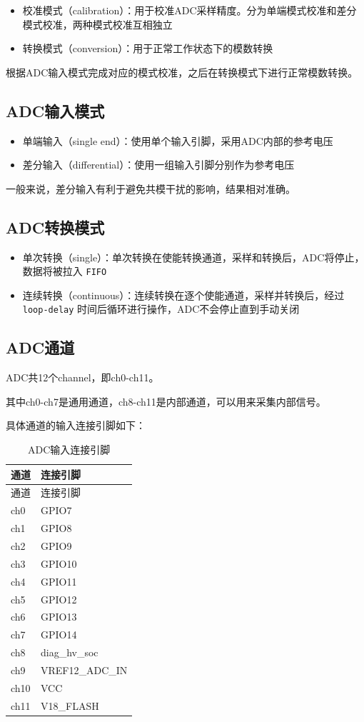 \documentclass[
  12pt,
]{book}
\begin{document}
\begin{itemize}
\item
  校准模式（calibration）：用于校准ADC采样精度。分为单端模式校准和差分模式校准，两种模式校准互相独立
\item
  转换模式（conversion）：用于正常工作状态下的模数转换
\end{itemize}

根据ADC输入模式完成对应的模式校准，之后在转换模式下进行正常模数转换。

\hypertarget{adcux8f93ux5165ux6a21ux5f0f}{%
\subsection{ADC输入模式}\label{adcux8f93ux5165ux6a21ux5f0f}}

\begin{itemize}
\item
  单端输入（single end）：使用单个输入引脚，采用ADC内部的参考电压
\item
  差分输入（differential）：使用一组输入引脚分别作为参考电压
\end{itemize}

一般来说，差分输入有利于避免共模干扰的影响，结果相对准确。

\hypertarget{adcux8f6cux6362ux6a21ux5f0f}{%
\subsection{ADC转换模式}\label{adcux8f6cux6362ux6a21ux5f0f}}

\begin{itemize}
\item
  单次转换（single）：单次转换在使能转换通道，采样和转换后，ADC将停止，数据将被拉入 \texttt{FIFO}
\item
  连续转换（continuous）：连续转换在逐个使能通道，采样并转换后，经过 \texttt{loop-delay} 时间后循环进行操作，ADC不会停止直到手动关闭
\end{itemize}

\hypertarget{adcux901aux9053}{%
\subsection{ADC通道}\label{adcux901aux9053}}

ADC共12个channel，即ch0-ch11。

其中ch0-ch7是通用通道，ch8-ch11是内部通道，可以用来采集内部信号。

具体通道的输入连接引脚如下：

\begin{longtable}[]{@{}ll@{}}
\caption{\label{tab:ch-ADC-input-connection} ADC输入连接引脚}\tabularnewline
\toprule
通道 & 连接引脚\tabularnewline
\midrule
\endfirsthead
\toprule
通道 & 连接引脚\tabularnewline
\midrule
\endhead
ch0 & GPIO7\tabularnewline
ch1 & GPIO8\tabularnewline
ch2 & GPIO9\tabularnewline
ch3 & GPIO10\tabularnewline
ch4 & GPIO11\tabularnewline
ch5 & GPIO12\tabularnewline
ch6 & GPIO13\tabularnewline
ch7 & GPIO14\tabularnewline
ch8 & diag\_hv\_soc\tabularnewline
ch9 & VREF12\_ADC\_IN\tabularnewline
ch10 & VCC\tabularnewline
ch11 & V18\_FLASH\tabularnewline
\bottomrule
\end{longtable}
\end{document}
